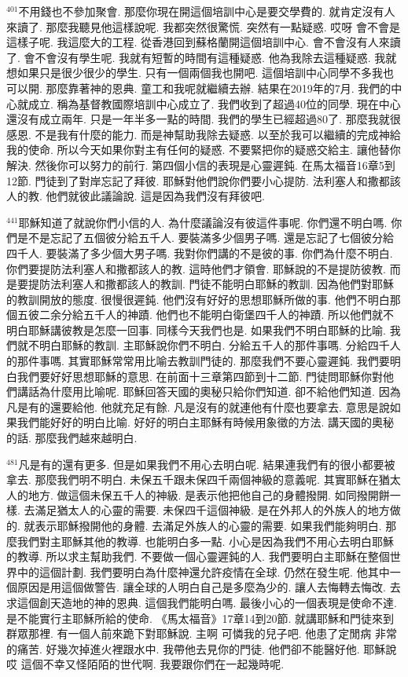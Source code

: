 \documentclass{book}
\begin{document}
$^{401}$不用錢也不參加聚會.
那麼你現在開這個培訓中心是要交學費的.
就肯定沒有人來讀了.
那麼我聽見他這樣說呢.
我都突然很驚慌.
突然有一點疑惑.
哎呀 會不會是這樣子呢.
我這麼大的工程.
從香港回到蘇格蘭開這個培訓中心.
會不會沒有人來讀了.
會不會沒有學生呢.
我就有短暫的時間有這種疑惑.
他為我除去這種疑惑.
我就想如果只是很少很少的學生.
只有一個兩個我也開吧.
這個培訓中心同學不多我也可以開.
那麼靠著神的恩典.
童工和我呢就繼續去辦.
結果在2019年的7月.
我們的中心就成立.
稱為基督教國際培訓中心成立了.
我們收到了超過40位的同學.
現在中心還沒有成立兩年.
只是一年半多一點的時間.
我們的學生已經超過80了.
那麼我就很感恩.
不是我有什麼的能力.
而是神幫助我除去疑惑.
以至於我可以繼續的完成神給我的使命.
所以今天如果你對主有任何的疑惑.
不要緊把你的疑惑交給主.
讓他替你解決.
然後你可以努力的前行.
第四個小信的表現是心靈遲鈍.
在馬太福音16章5到12節.
門徒到了對岸忘記了拜彼.
耶穌對他們說你們要小心提防.
法利塞人和撒都該人的教.
他們就彼此議論說.
這是因為我們沒有拜彼吧.

$^{441}$耶穌知道了就說你們小信的人.
為什麼議論沒有彼這件事呢.
你們還不明白嗎.
你們是不是忘記了五個彼分給五千人.
要裝滿多少個男子嗎.
還是忘記了七個彼分給四千人.
要裝滿了多少個大男子嗎.
我對你們講的不是彼的事.
你們為什麼不明白.
你們要提防法利塞人和撒都該人的教.
這時他們才領會.
耶穌說的不是提防彼教.
而是要提防法利塞人和撒都該人的教訓.
門徒不能明白耶穌的教訓.
因為他們對耶穌的教訓開放的態度.
很慢很遲鈍.
他們沒有好好的思想耶穌所做的事.
他們不明白那個五彼二余分給五千人的神蹟.
他們也不能明白衛堡四千人的神蹟.
所以他們就不明白耶穌講彼教是怎麼一回事.
同樣今天我們也是.
如果我們不明白耶穌的比喻.
我們就不明白耶穌的教訓.
主耶穌說你們不明白.
分給五千人的那件事嗎.
分給四千人的那件事嗎.
其實耶穌常常用比喻去教訓門徒的.
那麼我們不要心靈遲鈍.
我們要明白我們要好好思想耶穌的意思.
在前面十三章第四節到十二節.
門徒問耶穌你對他們講話為什麼用比喻呢.
耶穌回答天國的奧秘只給你們知道.
卻不給他們知道.
因為凡是有的還要給他.
他就充足有餘.
凡是沒有的就連他有什麼也要拿去.
意思是說如果我們能好好的明白比喻.
好好的明白主耶穌有時候用象徵的方法.
講天國的奧秘的話.
那麼我們越來越明白.

$^{481}$凡是有的還有更多.
但是如果我們不用心去明白呢.
結果連我們有的很小都要被拿去.
那麼我們明不明白.
未保五千跟未保四千兩個神級的意義呢.
其實耶穌在猶太人的地方.
做這個未保五千人的神級.
是表示他把他自己的身體撥開.
如同撥開餅一樣.
去滿足猶太人的心靈的需要.
未保四千這個神級.
是在外邦人的外族人的地方做的.
就表示耶穌撥開他的身體.
去滿足外族人的心靈的需要.
如果我們能夠明白.
那麼我們對主耶穌其他的教導.
也能明白多一點.
小心是因為我們不用心去明白耶穌的教導.
所以求主幫助我們.
不要做一個心靈遲鈍的人.
我們要明白主耶穌在整個世界中的這個計劃.
我們要明白為什麼神還允許疫情在全球.
仍然在發生呢.
他其中一個原因是用這個做警告.
讓全球的人明白自己是多麼為少的.
讓人去悔轉去悔改.
去求這個創天造地的神的恩典.
這個我們能明白嗎.
最後小心的一個表現是使命不達.
是不能實行主耶穌所給的使命.
《馬太福音》17章14到20節.
就講耶穌和門徒來到群眾那裡.
有一個人前來跪下對耶穌說.
主啊 可憐我的兒子吧.
他患了定閒病 非常的痛苦.
好幾次掉進火裡跟水中.
我帶他去見你的門徒.
他們卻不能醫好他.
耶穌說 哎 這個不幸又怪陌陌的世代啊.
我要跟你們在一起幾時呢.
\end{document}
